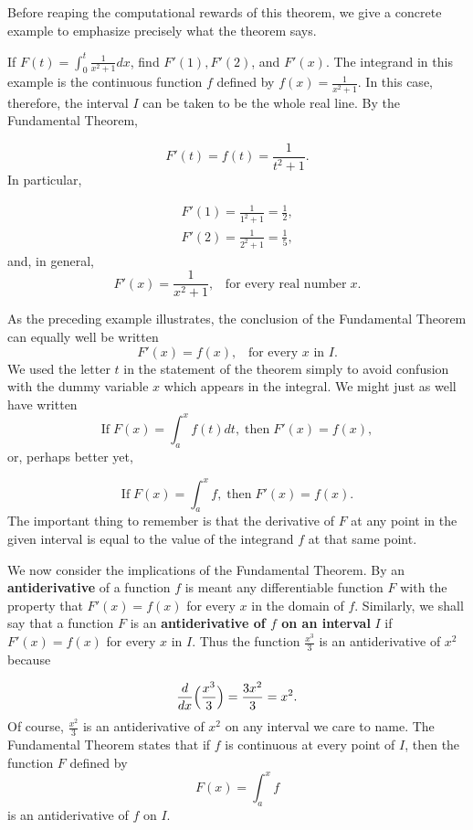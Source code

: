 Before reaping the computational rewards of this theorem, we give a concrete example to emphasize precisely what the theorem says.

\begin{example} 
If $F(t) = \int_{0}^{t} \frac{1}{x^2 + 1}dx$, find $F'(1), F'(2)$, and $F'(x)$.  The
integrand in this example is the continuous function $f$ defined by $f (x) = \frac{1}{x^2 + 1} $. In this case, therefore, the interval $I$ can be taken to be the whole real line. By the Fundamental Theorem,

$$
F'(t) = f(t) = \frac{1}{t^2 + 1}.
$$
\noindent In particular, 

\begin{eqnarray*}
F'(1) = \frac{1}{1^2 + 1} = \frac{1}{ 2},\\
F'(2) = \frac{1}{2^2 + 1} = \frac{1}{5}, 
\end{eqnarray*}
\noindent and, in general,
$$
F'(x) = \frac{1}{x^2 + 1}, \;\;\; \mbox{for every real number}\; x.
$$
\end{example}
\medskip

As the preceding example illustrates, the conclusion of the Fundamental Theorem can equally well be written
$$
F' (x) = f(x), \;\;\; \mbox{for every $x$ in $I$}.
$$
\noindent We used the letter $t$ in the statement of the theorem simply to avoid confusion with the dummy variable $x$ which appears in the integral. We might just as well have written
$$
\mbox{If}\; F(x) = \int_{a}^{x} f(t) dt, \;\mbox{then}\; F'(x) = f(x), 
$$
\noindent or, perhaps better yet,

$$
\mbox{If}\; F(x) = \int_{a}^{x} f, \;\mbox{then}\; F'(x) = f(x).
$$
\noindent The important thing to remember is that the derivative of $F$ at any point in the given interval is equal to the value of the integrand $f$ at that same point.

We now consider the implications of the Fundamental Theorem. By an \textbf{antiderivative} of a function $f$ is meant any differentiable function $F$ with the property that $F'(x) = f(x)$ for every $x$ in the domain of $f$. Similarly, we shall say that a function $F$ is an \textbf{antiderivative of $f$ on an interval} $I$ if $F' (x) = f(x)$ for every $x$ in $I$. Thus the function $\frac{x^3}{3}$ is an antiderivative  of $x^2$ because

$$
\frac{d}{dx} \Bigl( \frac{x^3}{3} \Bigr) = \frac{3x^2}{3} = x^2.
$$
\noindent Of course, $\frac{x^2}{3}$ is an antiderivative of $x^2$ on any interval we care to name. The Fundamental Theorem states that if $f$ is continuous at every point of $I$, then the function $F$ defined by
$$
F(x) = \int_{a}^{x} f
$$
\noindent is an antiderivative of $f$ on $I$.

